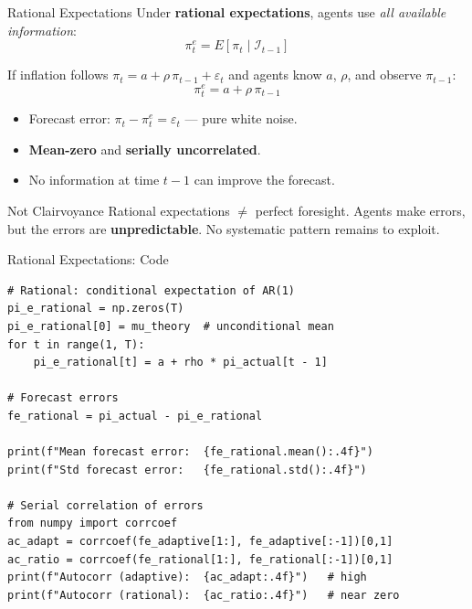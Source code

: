 \documentclass[aspectratio=169, 10pt]{beamer}
\begin{document}
\begin{frame}{Rational Expectations}
Under \textbf{rational expectations}, agents use \textit{all available information}:
\[
  \pi^e_t = E[\pi_t \mid \mathcal{I}_{t-1}]
\]

If inflation follows $\pi_t = a + \rho\,\pi_{t-1} + \varepsilon_t$ and
agents know $a$, $\rho$, and observe $\pi_{t-1}$:
\[
  \pi^e_t = a + \rho\,\pi_{t-1}
\]

\vspace{0.3em}
\begin{itemize}
  \item Forecast error: $\pi_t - \pi^e_t = \varepsilon_t$ --- pure white noise.
  \item \textbf{Mean-zero} and \textbf{serially uncorrelated}.
  \item No information at time $t-1$ can improve the forecast.
\end{itemize}

\vspace{0.3em}
\begin{block}{Not Clairvoyance}
Rational expectations $\neq$ perfect foresight. Agents make errors,
but the errors are \textbf{unpredictable}. No systematic pattern
remains to exploit.
\end{block}
\end{frame}

\begin{frame}[fragile]{Rational Expectations: Code}
\begin{lstlisting}
# Rational: conditional expectation of AR(1)
pi_e_rational = np.zeros(T)
pi_e_rational[0] = mu_theory  # unconditional mean
for t in range(1, T):
    pi_e_rational[t] = a + rho * pi_actual[t - 1]

# Forecast errors
fe_rational = pi_actual - pi_e_rational

print(f"Mean forecast error:  {fe_rational.mean():.4f}")
print(f"Std forecast error:   {fe_rational.std():.4f}")

# Serial correlation of errors
from numpy import corrcoef
ac_adapt = corrcoef(fe_adaptive[1:], fe_adaptive[:-1])[0,1]
ac_ratio = corrcoef(fe_rational[1:], fe_rational[:-1])[0,1]
print(f"Autocorr (adaptive):  {ac_adapt:.4f}")   # high
print(f"Autocorr (rational):  {ac_ratio:.4f}")   # near zero
\end{lstlisting}
\end{frame}
\end{document}
